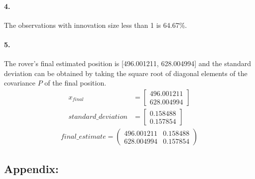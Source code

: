 \documentclass[a4paper]{article}
\begin{document}
\paragraph{4. } The observations with innovation size less than 1 is 64.67\%.
   
\paragraph{5. } The rover's final estimated position is [496.001211, 628.004994] and the standard deviation can be obtained by taking the square root of diagonal elements of the covariance $P$ of the final position.\\
\begin{align*}
	x_{final} &=
	\begin{bmatrix}
		496.001211 \\
    	628.004994
	\end{bmatrix} \\
	standard\_deviation &=
	\begin{bmatrix}
		0.158488 \\
    	0.157854
	\end{bmatrix}
\end{align*}
\begin{align*}
	final\_estimate =
	\begin{pmatrix}
		496.001211 & 0.158488 \\
    	628.004994 & 0.157854
	\end{pmatrix}
\end{align*}

\newpage
\subsection*{Appendix:}




\end{document}
